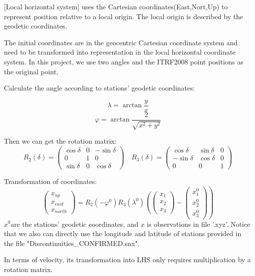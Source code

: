 \documentclass{article}
\begin{document}
[Local horizontal system] uses the Cartesian coordinates(East,Nort,Up) to represent position relative to a local origin. The local origin is described by the geodetic coordinates.

The initial coordinates are in the geocentric Cartesian coordinate system and need to be transformed into representation in the local horizontal coordinate system.
In this project, we use two angles and the ITRF2008 point positions as the original point, 

Calculate the angle according to stations' geodetic coordinates:

$$\lambda=\arctan\frac{y}{x}$$ 
$$\varphi=\arctan\frac{2}{\sqrt{x^{2}+y^{2}}}$$

Then we can get the rotation matrix:
$$R_2(\delta)=\begin{pmatrix}\cos\delta&0&-\sin\delta\\0&1&0\\\sin\delta&0&\cos\delta\end{pmatrix}\quad R_3(\delta)= \begin{pmatrix}\cos\delta&\sin\delta&0\\-\sin\delta&\cos\delta&0\\0&0&1\end{pmatrix}$$

Transformation of coordinates:
$$\left.\begin{pmatrix}x_{up}\\x_{east}\\x_{north}\end{pmatrix}=R_2(-\varphi^0)R_3(\lambda^0)\left(\begin{pmatrix}x_1\\x_2\\x_3\end{pmatrix}\right.-\begin{pmatrix}x_1^0\\x_2^0\\x_3^0\end{pmatrix}\right)$$
$x^0$are the stations' geodetic coordinates, and $x$ is observations in file '.xyz'.
Notice that we also can directly use the longitude and latitude of stations provided in the file "Discontinuities\_CONFIRMED.snx".

In terms of velocity, its transformation into LHS only requires multiplication by a rotation matrix.
\end{document}
